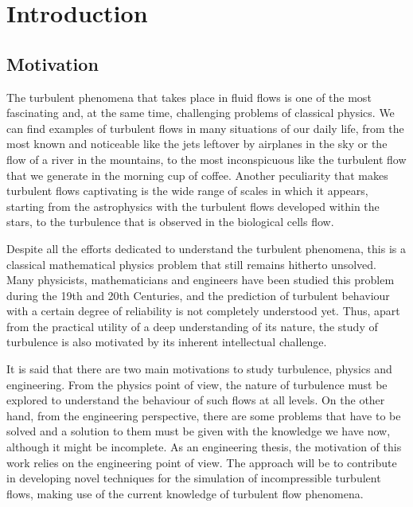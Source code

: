 
\chapter{Introduction}
\label{chap-Introduction}

\section{Motivation}

The turbulent phenomena that takes place in fluid flows is one of the most fascinating and, at the same time, challenging problems of classical physics. We can find examples of turbulent flows in many situations of our daily life, from the most known and noticeable like the jets leftover by airplanes in the sky or the flow of a river in the mountains, to the most inconspicuous like the turbulent flow that we generate in the morning cup of coffee. Another peculiarity that makes turbulent flows captivating is the wide range of scales in which it appears, starting from the astrophysics with the turbulent flows developed within the stars, to the turbulence that is observed in the biological cells flow.

Despite all the efforts dedicated to understand the turbulent phenomena, this is a classical mathematical physics problem that still remains hitherto unsolved. Many physicists, mathematicians and engineers have been studied this problem during the 19th and 20th Centuries, and the prediction of turbulent behaviour with a certain degree of reliability is not completely understood yet. Thus, apart from the practical utility of a deep understanding of its nature, the study of turbulence is also motivated by its inherent intellectual challenge.

It is said that there are two main motivations to study turbulence, physics and engineering. From the physics point of view, the nature of turbulence must be explored to understand the behaviour of such flows at all levels. On the other hand, from the engineering perspective, there are some problems that have to be solved and a solution to them must be given with the knowledge we have now, although it might be incomplete. As an engineering thesis, the motivation of this work relies on the engineering point of view. The approach will be to contribute in developing novel techniques for the simulation of incompressible turbulent flows, making use of the current knowledge of turbulent flow phenomena.

